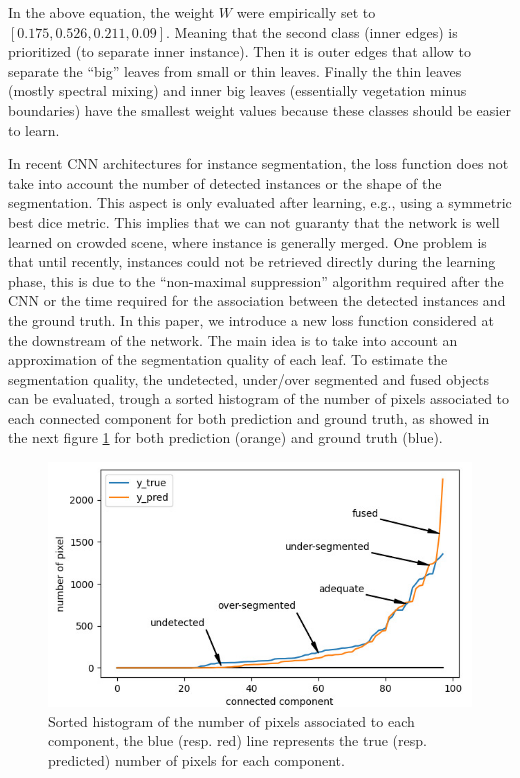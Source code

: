 \documentclass[../thesis.tex]{subfiles}
\begin{document}
    In the above equation, the weight $W$ were empirically set to $[0.175, 0.526, 0.211, 0.09]$. Meaning that the second class (inner edges) is prioritized (to separate inner instance). Then it is outer edges that allow to separate the ``big'' leaves from small or thin leaves. Finally the thin leaves (mostly spectral mixing) and inner big leaves (essentially vegetation minus boundaries) have the smallest weight values because these classes should be easier to learn.
    
    In recent CNN architectures for instance segmentation, the loss function does not take into account the number of detected instances or the shape of the segmentation. This aspect is only evaluated after learning, e.g., using a symmetric best dice metric. This implies that we can not guaranty that the network is well learned on crowded scene, where instance is generally merged. One problem is that until recently, instances could not be retrieved directly during the learning phase, this is due to the ``non-maximal suppression'' algorithm required after the CNN or the time required for the association between the detected instances and the ground truth. In this paper, we introduce a new loss function considered at the downstream of the network. The main idea is to take into account an approximation of the segmentation quality of each leaf.
    To estimate the segmentation quality, the undetected, under/over segmented and fused objects can be evaluated, trough a sorted histogram of the number of pixels associated to each connected component for both prediction and ground truth, as showed in the next figure \ref{fig:07-loss} for both prediction (orange) and ground truth (blue).
    
    \begin{figure}[H]
        \centering
        \includegraphics[width=0.7\linewidth]{img/leaf/Loss}
        \caption{Sorted histogram of the number of pixels associated to each component, the blue (resp. red) line represents the true (resp. predicted) number of pixels for each component.}
        \label{fig:07-loss}
    \end{figure}
    
\end{document}
